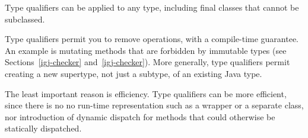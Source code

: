Type qualifiers can be applied to any type, including final classes that
cannot be subclassed.

Type qualifiers permit you to remove operations, with a compile-time
guarantee.  An example is mutating methods that are forbidden by immutable
types (see Sections~\ref{igj-checker} and~\ref{igj-checker}).  More
generally, type qualifiers permit creating a new supertype, not just a
subtype, of an existing Java type.

The least important reason is efficiency.  Type qualifiers can be more
efficient, since there is no no run-time representation such as a wrapper
or a separate class, nor introduction of dynamic dispatch for methods that
could otherwise be statically dispatched.



